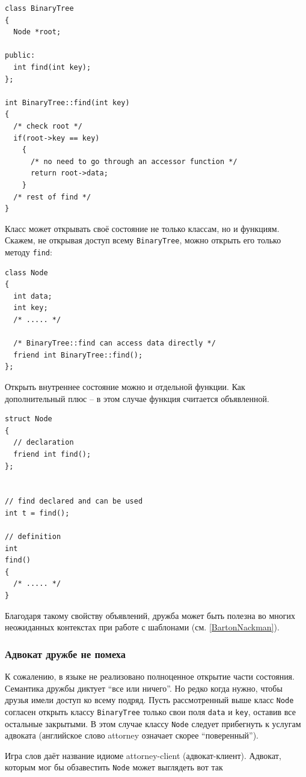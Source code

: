 \documentclass[a4paper,12pt,oneside]{article}
\begin{document}
\begin{lstlisting}
class BinaryTree
{
  Node *root;

public:
  int find(int key);
};

int BinaryTree::find(int key)
{
  /* check root */
  if(root->key == key)
    {
      /* no need to go through an accessor function */
      return root->data;
    }
  /* rest of find */
}
\end{lstlisting}


Класс может открывать своё состояние не только классам, но и функциям. Скажем, не открывая доступ всему \lstinline!BinaryTree!, можно открыть его только методу \lstinline!find!:

\begin{lstlisting}
class Node
{
  int data;
  int key;
  /* ..... */

  /* BinaryTree::find can access data directly */
  friend int BinaryTree::find();
};
\end{lstlisting}

Открыть внутреннее состояние можно и отдельной функции. Как дополнительный плюс -- в этом случае функция считается объявленной.

\begin{lstlisting}
struct Node
{
  // declaration
  friend int find();
};


// find declared and can be used
int t = find();

// definition
int
find() 
{
  /* ..... */
}
\end{lstlisting}

Благодаря такому свойству объявлений, дружба может быть полезна во многих неожиданных контекстах при работе с шаблонами (см. \ref{BartonNackman}).

\subsubsection{Адвокат дружбе не помеха}

К сожалению, в языке не реализовано полноценное открытие части состояния. Семантика дружбы диктует ``все или ничего''. Но редко когда нужно, чтобы друзья имели доступ ко всему подряд. Пусть рассмотренный выше класс \lstinline!Node! согласен открыть классу \lstinline!BinaryTree! только свои поля \lstinline!data! и \lstinline!key!, оставив все остальные закрытыми. В этом случае классу \lstinline!Node! следует прибегнуть к услугам адвоката (английское слово attorney означает скорее ``поверенный'').

Игра слов даёт название идиоме attorney-client (адвокат-клиент). Адвокат, которым мог бы обзавестить \lstinline!Node! может выглядеть вот так
\end{document}
